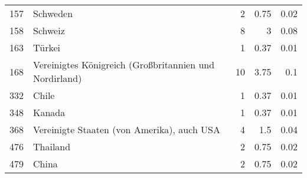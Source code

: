 \begin{longtable}{lXrrr}
        157 & \multicolumn{1}{X}{Schweden} & %
          \num{2} &
          \num[round-mode=places,round-precision=2]{0,75} &
          \num[round-mode=places,round-precision=2]{0,02} \\

        158 & \multicolumn{1}{X}{Schweiz} & %
          \num{8} &
          \num[round-mode=places,round-precision=2]{3} &
          \num[round-mode=places,round-precision=2]{0,08} \\

        163 & \multicolumn{1}{X}{Türkei} & %
          \num{1} &
          \num[round-mode=places,round-precision=2]{0,37} &
          \num[round-mode=places,round-precision=2]{0,01} \\

        168 & \multicolumn{1}{X}{Vereinigtes Königreich (Großbritannien und Nordirland)} & %
          \num{10} &
          \num[round-mode=places,round-precision=2]{3,75} &
          \num[round-mode=places,round-precision=2]{0,1} \\

        332 & \multicolumn{1}{X}{Chile} & %
          \num{1} &
          \num[round-mode=places,round-precision=2]{0,37} &
          \num[round-mode=places,round-precision=2]{0,01} \\

        348 & \multicolumn{1}{X}{Kanada} & %
          \num{1} &
          \num[round-mode=places,round-precision=2]{0,37} &
          \num[round-mode=places,round-precision=2]{0,01} \\

        368 & \multicolumn{1}{X}{Vereinigte Staaten (von Amerika), auch USA} & %
          \num{4} &
          \num[round-mode=places,round-precision=2]{1,5} &
          \num[round-mode=places,round-precision=2]{0,04} \\

        476 & \multicolumn{1}{X}{Thailand} & %
          \num{2} &
          \num[round-mode=places,round-precision=2]{0,75} &
          \num[round-mode=places,round-precision=2]{0,02} \\

        479 & \multicolumn{1}{X}{China} & %
          \num{2} &
          \num[round-mode=places,round-precision=2]{0,75} &
          \num[round-mode=places,round-precision=2]{0,02} \\


\end{longtable}
